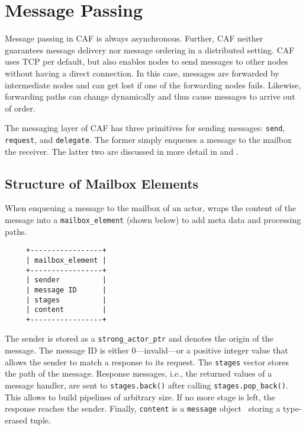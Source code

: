 \section{Message Passing}
\label{message-passing}

Message passing in CAF is always asynchronous. Further, CAF neither guarantees message delivery nor message ordering in a distributed setting. CAF uses TCP per default, but also enables nodes to send messages to other nodes without having a direct connection.  In this case, messages are forwarded by intermediate nodes and can get lost if one of the forwarding nodes fails. Likewise, forwarding paths can change dynamically and thus cause messages to arrive out of order.

The messaging layer of CAF has three primitives for sending messages: \lstinline^send^, \lstinline^request^, and \lstinline^delegate^. The former simply enqueues a message to the mailbox the receiver. The latter two are discussed in more detail in  and .

\subsection{Structure of Mailbox Elements}
\label{mailbox-element}

When enqueuing a message to the mailbox of an actor, \lib wraps the content of the message into a \lstinline^mailbox_element^ (shown below) to add meta data and processing paths.

{\footnotesize
\begin{verbatim}
     +-----------------+
     | mailbox_element |
     +-----------------+
     | sender          |
     | message ID      |
     | stages          |
     | content         |
     +-----------------+
\end{verbatim}}

The sender is stored as a \lstinline^strong_actor_ptr^  and denotes the origin of the message. The message ID is either 0---invalid---or a positive integer value that allows the sender to match a response to its request. The \lstinline^stages^ vector stores the path of the message. Response messages, i.e., the returned values of a message handler, are sent to \lstinline^stages.back()^ after calling \lstinline^stages.pop_back()^. This allows \lib to build pipelines of arbitrary size. If no more stage is left, the response reaches the sender. Finally, \lstinline^content^ is a \lstinline^message^ object~ storing a type-erased tuple.

